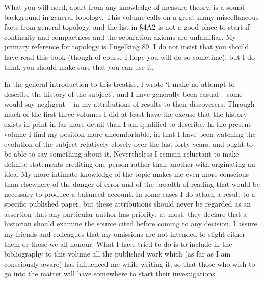 What you will need, apart from any knowledge of measure theory, is a
sound background in general topology.   This volume calls on a great
many miscellaneous facts from general topology, and the list in \S4A2 is
not a good place to start if continuity and compactness and the
separation axioms are unfamiliar.   My primary reference for topology is
{\smc Engelking 89}.   I do not insist that you should have read this
book (though of course I hope you will do so sometime);  but I do think
you should make sure that you can use it.

In the general introduction to this treatise, I wrote `I make no attempt
to describe the history of the subject', and I have generally been
casual -- some would say negligent -- in my attributions of results to
their discoverers.   Through much of the first three volumes I did at
least have the excuse that the history exists in print in far
more detail than I am qualified to describe.   In the present volume I
find my position more uncomfortable, in that I have been watching
the evolution of the subject relatively closely over the last forty
years, and ought to be able to say something about it.   Nevertheless I
remain reluctant to make definite
statements crediting one person rather than another with originating an
idea.   My more intimate knowledge of the topic makes me even more
conscious than elsewhere of the danger of error and of the breadth of
reading that would be necessary to produce a balanced account.   In some
cases I do attach a result to a specific published paper, but these
attributions should never be regarded as an assertion that any
particular author has priority;  at most, they declare that a historian
should examine the source cited before coming to any decision.   I
assure my friends and colleagues that my omissions are not intended to
slight either them or those we all honour.   What I have tried to do is
to include in
the bibliography to this volume all the published work which (as far as
I am consciously aware) has influenced me while writing it, so that
those who wish to go into the matter will have somewhere to start their
investigations.

\frnewpage

